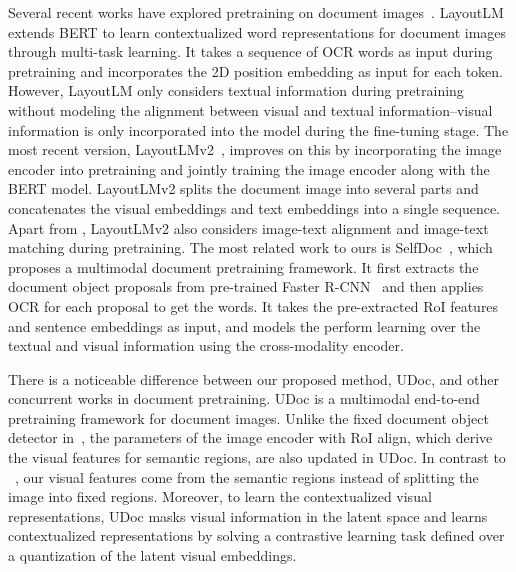 \documentclass{article}
\begin{document}
	Several recent works have explored pretraining on document images~\cite{xu2020layoutlm,xu2020layoutlmv2,patil2020read}.
	LayoutLM~\cite{xu2020layoutlm} {extends} BERT to learn contextualized word representations for document images through multi-task learning. It takes a sequence of OCR words as input during pretraining and {incorporates the} 2D position embedding {as input} for each token. However, {LayoutLM} only considers textual information during pretraining without modeling the alignment between visual and textual information{--visual information is only incorporated into the model during the fine-tuning stage}. {The most} recent version, LayoutLMv2~\cite{xu2020layoutlmv2}, {improves on this by incorporating} the image encoder into pretraining and jointly {training} the image encoder along with the BERT model. {LayoutLMv2} splits the document image into several parts and concatenates the visual embeddings and text embeddings {into a single} sequence. Apart from , {LayoutLMv2} also considers image-text alignment and image-text matching during pretraining. The most related work to ours is SelfDoc~\cite{selfdoc2021}, which proposes a multimodal document pretraining framework. 
	It first extracts the document object proposals from pre-trained Faster R-CNN~\cite{girshick2015fast} and then applies OCR for each proposal to get the words. It takes the pre-extracted RoI features and sentence embeddings as input, and models the perform learning over the textual and visual information using the cross-modality encoder.
	
	There is a noticeable difference between our {proposed method, UDoc,} and other concurrent works in document  pretraining.
	UDoc is a multimodal end-to-end pretraining framework for document images. Unlike the fixed document object detector in~\cite{selfdoc2021}, {the} parameters of {the} image encoder with RoI align, which derive the visual features for semantic regions, are also updated in UDoc. 
	{In contrast to} ~\cite{xu2020layoutlmv2}, our visual features come from the semantic regions instead of {splitting} the image into fixed regions.
	Moreover, to learn the contextualized visual representations, UDoc masks visual information in the latent space and learns contextualized representations by solving a contrastive learning task defined over a quantization of the latent visual embeddings.
	
\end{document}
